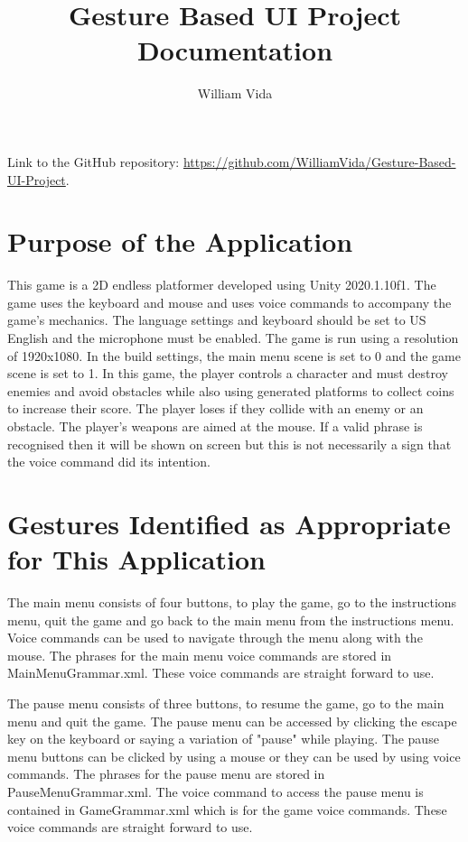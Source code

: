 \documentclass{article}
\title{Gesture Based UI Project Documentation}
\author{William Vida}
\date{}
\begin{document}
\maketitle

Link to the GitHub repository: \url{https://github.com/WilliamVida/Gesture-Based-UI-Project}.

\tableofcontents

\newpage

\section{Purpose of the Application}
This game is a 2D endless platformer developed using Unity 2020.1.10f1. The game uses the keyboard and mouse and uses voice commands to accompany the game's mechanics. The language settings and keyboard should be set to US English and the microphone must be enabled. The game is run using a resolution of 1920x1080. In the build settings, the main menu scene is set to 0 and the game scene is set to 1. In this game, the player controls a character and must destroy enemies and avoid obstacles while also using generated platforms to collect coins to increase their score. The player loses if they collide with an enemy or an obstacle. The player's weapons are aimed at the mouse. If a valid phrase is recognised then it will be shown on screen but this is not necessarily a sign that the voice command did its intention.

\section{Gestures Identified as Appropriate for This Application}
The main menu consists of four buttons, to play the game, go to the instructions menu, quit the game and go back to the main menu from the instructions menu. Voice commands can be used to navigate through the menu along with the mouse. The phrases for the main menu voice commands are stored in MainMenuGrammar.xml. These voice commands are straight forward to use.

The pause menu consists of three buttons, to resume the game, go to the main menu and quit the game. The pause menu can be accessed by clicking the escape key on the keyboard or saying a variation of "pause" while playing. The pause menu buttons can be clicked by using a mouse or they can be used by using voice commands. The phrases for the pause menu are stored in PauseMenuGrammar.xml. The voice command to access the pause menu is contained in GameGrammar.xml which is for the game voice commands. These voice commands are straight forward to use.
\end{document}
